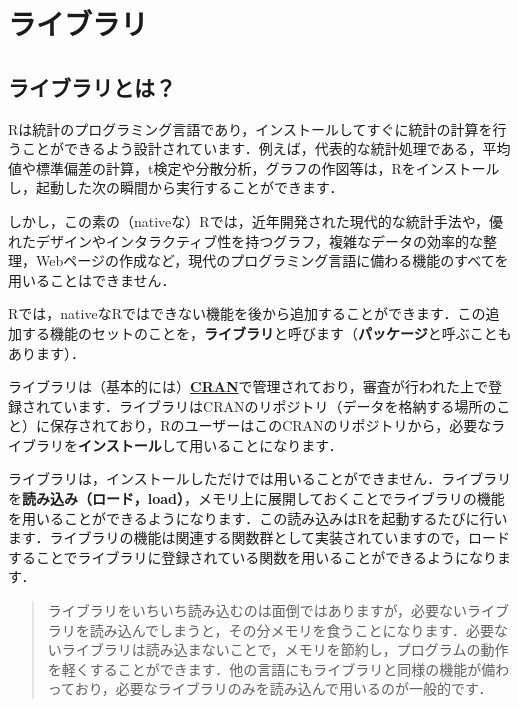 \documentclass[
  letterpaper,
  DIV=11,
  numbers=noendperiod]{scrreprt}
\begin{document}
\hypertarget{ux30e9ux30a4ux30d6ux30e9ux30ea}{%
\chapter{ライブラリ}\label{ux30e9ux30a4ux30d6ux30e9ux30ea}}

\hypertarget{ux30e9ux30a4ux30d6ux30e9ux30eaux3068ux306f}{%
\section{ライブラリとは？}\label{ux30e9ux30a4ux30d6ux30e9ux30eaux3068ux306f}}

Rは統計のプログラミング言語であり，インストールしてすぐに統計の計算を行うことができるよう設計されています．例えば，代表的な統計処理である，平均値や標準偏差の計算，t検定や分散分析，グラフの作図等は，Rをインストールし，起動した次の瞬間から実行することができます．

しかし，この素の（nativeな）Rでは，近年開発された現代的な統計手法や，優れたデザインやインタラクティブ性を持つグラフ，複雑なデータの効率的な整理，Webページの作成など，現代のプログラミング言語に備わる機能のすべてを用いることはできません．

Rでは，nativeなRではできない機能を後から追加することができます．この追加する機能のセットのことを，\textbf{ライブラリ}と呼びます（\textbf{パッケージ}と呼ぶこともあります）．

ライブラリは（基本的には）\href{https://cran.r-project.org/}{\textbf{CRAN}}で管理されており，審査が行われた上で登録されています．ライブラリはCRANのリポジトリ（データを格納する場所のこと）に保存されており，RのユーザーはこのCRANのリポジトリから，必要なライブラリを\textbf{インストール}して用いることになります．

ライブラリは，インストールしただけでは用いることができません．ライブラリを\textbf{読み込み（ロード，load）}，メモリ上に展開しておくことでライブラリの機能を用いることができるようになります．この読み込みはRを起動するたびに行います．ライブラリの機能は関連する関数群として実装されていますので，ロードすることでライブラリに登録されている関数を用いることができるようになります．

\begin{quote}
ライブラリをいちいち読み込むのは面倒ではありますが，必要ないライブラリを読み込んでしまうと，その分メモリを食うことになります．必要ないライブラリは読み込まないことで，メモリを節約し，プログラムの動作を軽くすることができます．他の言語にもライブラリと同様の機能が備わっており，必要なライブラリのみを読み込んで用いるのが一般的です．
\end{quote}
\end{document}
